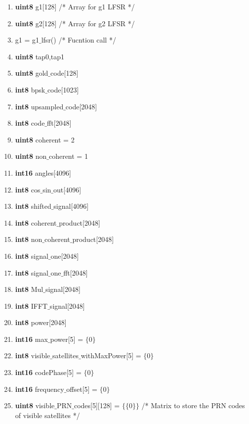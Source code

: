 \documentclass[journal,10pt,onecolumn]{article}
\begin{document}
\begin{enumerate}
    \item \textbf{uint8} g1[128]   \hspace{5mm} /*  Array for g1 LFSR */
    \item \textbf{uint8} g2[128]   \hspace{5mm} /* Array for g2 LFSR */
    \item g1 =  g1$\_$lfsr()       \hspace{5mm} /* Fucntion call */
    \item \textbf{uint8} tap0,tap1
    \item \textbf{uint8} gold$\_$code[128] 
    \item \textbf{int8} bpsk$\_$code[1023]
    \item \textbf{int8} upsampled$\_$code[2048]
    \item \textbf{int8} code$\_$fft[2048]
    \item \textbf{uint8} coherent = 2
    \item \textbf{uint8} non$\_$coherent = 1
    \item \textbf{int16} angles[4096]
    \item  \textbf{int8} cos$\_$sin$\_$out[4096]
    \item  \textbf{int8} shifted$\_$signal[4096]
    \item \textbf{int8}  coherent$\_$product[2048]
    \item  \textbf{int8} non$\_$coherent$\_$product[2048]
    \item  \textbf{int8} signal$\_$one[2048]
    \item   \textbf{int8} signal$\_$one$\_$fft[2048]
    \item  \textbf{int8} Mul$\_$signal[2048]
    \item  \textbf{int8} IFFT$\_$signal[2048]
    \item  \textbf{int8} power[2048]
    \item \textbf{int16} max$\_$power[5] = $\{0\}$ 
    \item \textbf{int8} visible$\_$satellites$\_$withMaxPower[5] = $\{0\}$
    \item \textbf{int16} codePhase[5] = $\{0\}$
    \item  \textbf{int16} frequency$\_$offset[5] = $\{0\}$
    \item  \textbf{uint8} visible$\_$PRN$\_$codes[5][128] = $\{\{0\}\}$  \hspace{5mm} /* Matrix to store the PRN codes of visible satellites */ 



\end{enumerate}
\end{document}
